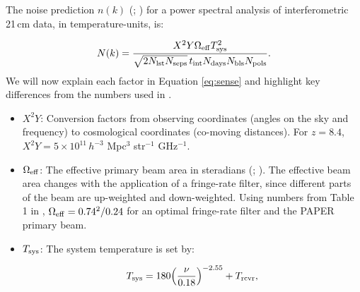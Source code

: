 \documentclass[preprint2,numberedappendix,tighten]{aastex6}
\begin{document}
The noise prediction $n(k)$ (\citealt{parsons_et_al2012a}; \citealt{pober_et_al2013}) for a power spectral analysis of 
interferometric 21\,cm data, in temperature-units, is:

\begin{equation}
\label{eq:sense}
N(k) = \frac{X^{2}Y \Omega_{\rm eff} T_{\rm sys}^{2}}{\sqrt{2N_{\rm lst}N_{\rm seps}}\,t_{\rm int}N_{\rm days}N_{\rm bls}N_{\rm pols}}.
\end{equation}
We will now explain each factor in Equation \eqref{eq:sense} and highlight key differences from the numbers used in .

\begin{itemize}
\item $X^{2}Y$: Conversion factors from observing coordinates (angles on the sky and frequency) to cosmological coordinates (co-moving 
distances). For $z=8.4$, $X^{2}Y = 5 \times 10^{11} \, h^{-3}$ Mpc$^{3}$ str$^{-1}$ GHz$^{-1}$.
\item $\Omega_{\rm eff}$: The effective primary beam area in steradians (\citealt{parsons_et_al2010}; \citealt{pober_et_al2012}). 
The effective beam area changes with the application of a fringe-rate filter, since different parts of the beam are up-weighted and down-weighted. Using numbers from Table 1 in \citet{parsons_et_al2016}, $\Omega_{\rm eff} = 0.74^{2}/0.24$ for an optimal fringe-rate 
filter and the PAPER primary beam. 
\item $T_{\rm sys}$: The system temperature is set by:

\begin{equation}
\label{eq:sys}
T_{\rm sys} = 180\Big(\frac{\nu}{0.18}\Big)^{-2.55} + T_{\rm rcvr},
\end{equation}


\end{itemize}
\end{document}
